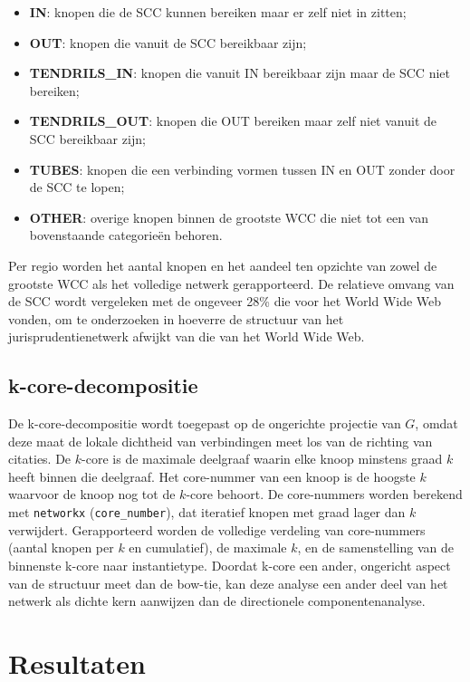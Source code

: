 \documentclass[a4paper, 12pt]{report}
\begin{document}
\begin{itemize}
  \item \textbf{IN}: knopen die de SCC kunnen bereiken maar er zelf niet in zitten;
  \item \textbf{OUT}: knopen die vanuit de SCC bereikbaar zijn;
  \item \textbf{TENDRILS\_IN}: knopen die vanuit IN bereikbaar zijn maar de SCC niet bereiken;
  \item \textbf{TENDRILS\_OUT}: knopen die OUT bereiken maar zelf niet vanuit de SCC bereikbaar zijn;
  \item \textbf{TUBES}: knopen die een verbinding vormen tussen IN en OUT zonder door de SCC te lopen;
  \item \textbf{OTHER}: overige knopen binnen de grootste WCC die niet tot een van bovenstaande categorieën behoren.
\end{itemize}

Per regio worden het aantal knopen en het aandeel ten opzichte van zowel de grootste WCC als het volledige netwerk gerapporteerd. De relatieve omvang van de SCC wordt vergeleken met de ongeveer 28\% die \textcite{broder2000} voor het World Wide Web vonden, om te onderzoeken in hoeverre de structuur van het jurisprudentienetwerk afwijkt van die van het World Wide Web.

\subsection{k-core-decompositie} De k-core-decompositie \parencite{seidman1983, carmi2007} wordt toegepast op de ongerichte projectie van $G$, omdat deze maat de lokale dichtheid van verbindingen meet los van de richting van citaties. De $k$-core is de maximale deelgraaf waarin elke knoop minstens graad $k$ heeft binnen die deelgraaf. Het core-nummer van een knoop is de hoogste $k$ waarvoor de knoop nog tot de $k$-core behoort. De core-nummers worden berekend met \texttt{networkx} (\texttt{core\_number}), dat iteratief knopen met graad lager dan $k$ verwijdert. Gerapporteerd worden de volledige verdeling van core-nummers (aantal knopen per $k$ en cumulatief), de maximale $k$, en de samenstelling van de binnenste k-core naar instantietype. Doordat k-core een ander, ongericht aspect van de structuur meet dan de bow-tie, kan deze analyse een ander deel van het netwerk als dichte kern aanwijzen dan de directionele componentenanalyse.



\section{Resultaten}
\end{document}
